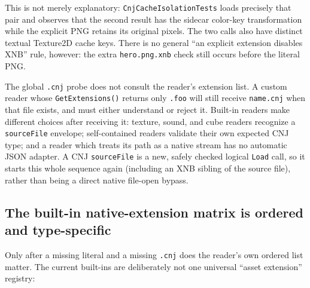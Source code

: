 This is not merely explanatory: \texttt{CnjCacheIsolationTests} loads precisely that pair and
observes that the second result has the sidecar color-key transformation while the explicit PNG
retains its original pixels. The two calls also have distinct textual Texture2D cache keys.
There is no general ``an explicit extension disables XNB'' rule, however: the extra
\texttt{hero.png.xnb} check still occurs before the literal PNG.

The global \texttt{.cnj} probe does not consult the reader's extension list. A custom reader
whose \texttt{GetExtensions()} returns only \texttt{.foo} will still receive
\texttt{name.cnj} when that file exists, and must either understand or reject it. Built-in
readers make different choices after receiving it: texture, sound, and cube readers recognize a
\texttt{sourceFile} envelope; self-contained readers validate their own expected CNJ type; and
a reader which treats its path as a native stream has no automatic JSON adapter. A CNJ
\texttt{sourceFile} is a new, safely checked logical \texttt{Load} call, so it starts this whole
sequence again (including an XNB sibling of the source file), rather than being a direct native
file-open bypass.

\subsection{The built-in native-extension matrix is ordered and type-specific}

Only after a missing literal and a missing \texttt{.cnj} does the reader's own ordered list
matter. The current built-ins are deliberately not one universal ``asset extension'' registry:

